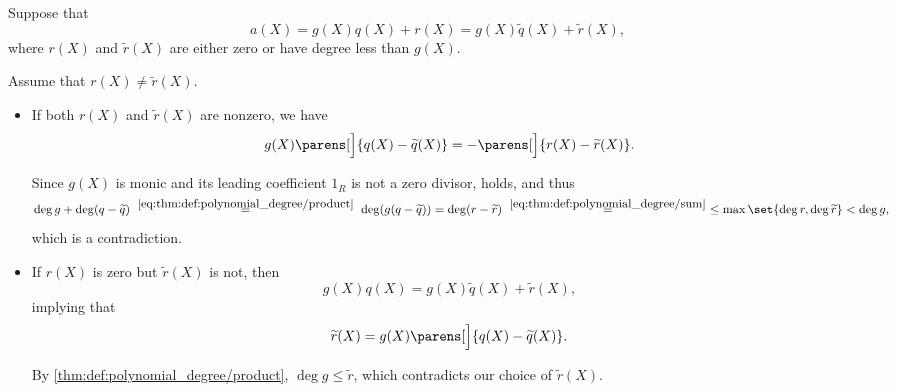 \begin{defproof}
   Suppose that
  \begin{equation*}
    a(X) = g(X)q(X) + r(X) = g(X) \widetilde{q}(X) + \widetilde{r}(X),
  \end{equation*}
  where \( r(X) \) and \( \widetilde{r}(X) \) are either zero or have degree less than \( g(X) \).

  Assume that \( r(X) \neq \widetilde{r}(X) \).

  \begin{itemize}
    \item If both \( r(X) \) and \( \widetilde{r}(X) \) are nonzero, we have
    \begin{equation*}
      g(X) \parens[\Big]{ q(X) - \widetilde{q}(X) } = -\parens[\Big]{ r(X) - \widetilde{r}(X) }.
    \end{equation*}

    Since \( g(X) \) is monic and its leading coefficient \( 1_R \) is not a zero divisor,  holds, and thus
    \begin{equation*}
      \deg g + \deg(q - \widetilde{q})
      \reloset {\eqref{eq:thm:def:polynomial_degree/product}} =
      \deg(g (q - \widetilde{q}))
      =
      \deg(r - \widetilde{r})
      \reloset {\eqref{eq:thm:def:polynomial_degree/sum}} =
      \leq \max\set{ \deg r, \deg \widetilde{r} }
      <
      \deg g,
    \end{equation*}
    which is a contradiction.

    \item If \( r(X) \) is zero but \( \widetilde{r}(X) \) is not, then
    \begin{equation*}
      g(X) q(X) = g(X) \widetilde{q}(X) + \widetilde{r}(X),
    \end{equation*}
    implying that
    \begin{equation*}
      \widetilde{r}(X) = g(X) \parens[\Big]{ q(X) - \widetilde{q}(X) }.
    \end{equation*}

    By \eqref{thm:def:polynomial_degree/product}, \( \deg g \leq \widetilde{r} \), which contradicts our choice of \( \widetilde{r}(X) \).
  \end{itemize}
\end{defproof}

